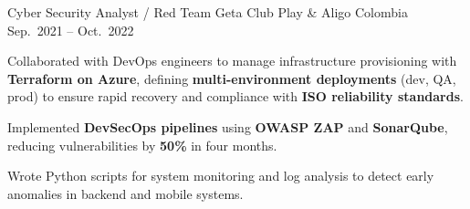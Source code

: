 \begin{cventries}
  \cventry
  {Cyber Security Analyst / Red Team}
  {Geta Club Play \& Aligo}
  {Colombia}
  {Sep.\ 2021 -- Oct.\ 2022}
  {
    \begin{cvitems}
      \item {Collaborated with DevOps engineers to manage infrastructure provisioning with \textbf{Terraform on Azure}, defining \textbf{multi-environment deployments} (dev, QA, prod) to ensure rapid recovery and compliance with \textbf{ISO reliability standards}.}
      \item {Implemented \textbf{DevSecOps pipelines} using \textbf{OWASP ZAP} and \textbf{SonarQube}, reducing vulnerabilities by \textbf{50\%} in four months.}
      \item {Wrote Python scripts for system monitoring and log analysis to detect early anomalies in backend and mobile systems.}
    \end{cvitems}
  }

\end{cventries}
